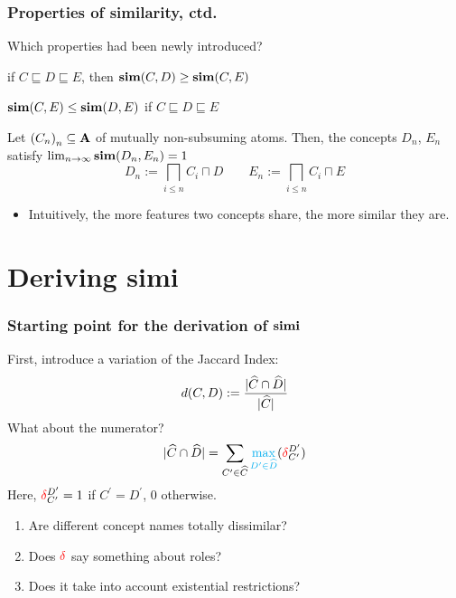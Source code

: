 \documentclass{beamer}
\begin{document}
\begin{frame}
  \frametitle{Properties of similarity, ctd.}

  Which properties had been newly introduced?
  \begin{description}[<+->]
    \item[\(\sqsubseteq\)-preserving] if \(C \sqsubseteq D \sqsubseteq E\),
    then \(\operatorname{\mathbf{sim}}(C,D) \ge \operatorname{\mathbf{sim}}(C,E)\)
    \item[Reverse \(\sqsubseteq\)-preserving]
    \(\operatorname{\mathbf{sim}}(C,E) \le \operatorname{\mathbf{sim}}(D,E)\) if
    \(C \sqsubseteq D \sqsubseteq E\)
    \item[Structurally dependent]
    Let \({(C_n)}_n \subseteq \mathbf{A}\) of mutually
    non-subsuming atoms. Then, the concepts
    \(D_n\), \(E_n\) satisfy
    \(\lim_{n \to \infty} \operatorname{\mathbf{sim}}(D_n,E_n) = 1\)
    \begin{equation*}
      D_n := \bigsqcap_{i \le n} C_i \sqcap D \qquad
      E_n := \bigsqcap_{i \le n} C_i \sqcap E
    \end{equation*}
  \end{description}
  \begin{itemize}[<+->]
    \item Intuitively, the more \alert{features}
    two concepts share, the more similar they are.
  \end{itemize}
\end{frame}

\section{Deriving simi}

\begin{frame}
  \frametitle{Starting point for the derivation of \(\operatorname{\mathbf{simi}}\)}
  First, introduce a variation of the \alert{Jaccard Index}:
  \begin{equation}
    d(C,D) := \frac{\abs{\atom{C} \cap \atom{D}}}%
                   {\abs{\atom{C}}}
  \end{equation}
  What about the numerator?
  \begin{equation}
    \abs{\atom{C} \cap \atom{D}} =
    \sum_{C^\prime \in \atom{C}}%
      \textcolor{cyan}{\max_{D^\prime \in \atom{D}}}%
      (\textcolor{red}{\delta}_{C^\prime}^{D^\prime})
  \end{equation}
  Here, \(\textcolor{red}{\delta}_{C^\prime}^{D^\prime} = 1\) if
  \(C^\prime = D^\prime\), \(0\) otherwise.
  \pause
  \begin{enumerate}[<+->]
    \item Are different concept names totally dissimilar?
    \item Does \(\textcolor{red}{\delta}\) say something about roles?
    \item Does it take into account existential restrictions?
  \end{enumerate}
\end{frame}
\end{document}
